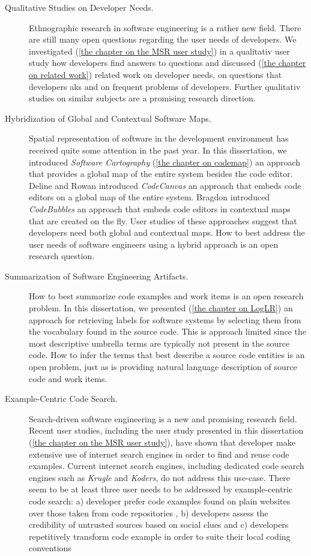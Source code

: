 \begin{description}
\item[Qualitative Studies on Developer Needs.] 
%
Ethnographic research in software engineering is a rather new field. There are still many open questions regarding the user needs of developers. We investigated (\autoref{the chapter on the MSR user study}) in a qualitativ user study how developers find answers to questions and discussed (\autoref{the chapter on related work}) related work on developer needs, on questions that developers aks and on frequent problems of developers. Further qualitativ studies on similar subjects are a promising research direction.

\item[Hybridization of Global and Contextual Software Maps.] 
%
Spatial representation of software in the development environment has received quite some attention in the past year. In this dissertation, we introduced \emph{Software Cartography} (\autoref{the chapter on codemap}) an approach that provides a global map of the entire system besides the code editor. Deline and Rowan introduced \emph{CodeCanvas} \cite{Deli10a} an approach that embeds code editors on a global map of the entire system. Bragdon \etal introduced \emph{CodeBubbles} \cite{Brag10a,Brag10b} an approach that embeds code editors in contextual maps that are created on the fly. User studies of these approaches suggest that developers need both global and contextual maps. How to best address the user needs of software engineers using a hybrid approach is an open research question. 

\item[Summarization of Software Engineering Artifacts.] 
%
How to best summarize code examples and work items is an open research problem.
In this dissertation, we presented (\autoref{the chapter on LogLR}) an approach for retrieving labels for software systems by selecting them from the vocabulary found in the source code. This is approach limited since the most descriptive umbrella terms are typically not present in the source code. How to infer the terms that best describe a source code entities is an open problem, just as is providing natural language description of source code and work items.

\item[Example-Centric Code Search.] Search-driven software engineering is a new and promising research field. Recent user studies, including the user study presented in this dissertation (\autoref{the chapter on the MSR user study}), have shown that developer make extensive use of internet search engines in order to find and reuse code examples. Current internet search engines, including dedicated code search engines such as \emph{Krugle} and \emph{Koders}, do not address this use-case. There seem to be at least three user needs to be addressed by example-centric code search: a) developer prefer code examples found on plain websites over those taken from code repositories , b) developers assess the credibility of untrusted sources based on social clues and c) developers repetitively transform code example in order to suite their local coding conventions


\end{description}

